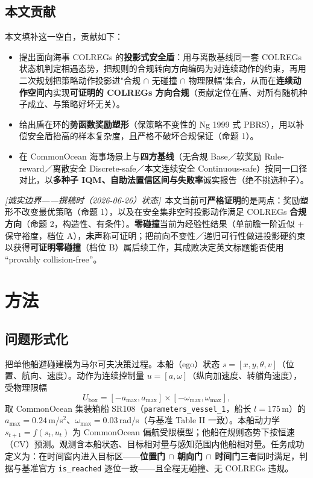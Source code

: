 \documentclass[12pt,letterpaper]{article}
\begin{document}
\subsection{本文贡献}
本文填补这一空白，贡献如下：
\begin{itemize}
  \item 提出面向海事 COLREGs 的\textbf{投影式安全盾}：用与离散基线同一套 COLREGs 状态机判定相遇态势，把规则的合规转向方向编码为对连续动作的约束，再用二次规划把策略动作投影进"合规 $\cap$ 无碰撞 $\cap$ 物理限幅"集合，从而在\textbf{连续动作空间}内实现\textbf{可证明的 COLREGs 方向合规}（贡献定位在盾、对所有随机种子成立、与策略好坏无关）。
  \item 给出盾在环的\textbf{势函数奖励塑形}（保策略不变性的 Ng 1999 式 PBRS），用以补偿安全盾抬高的样本复杂度，且严格不破坏合规保证（命题 1）。
  \item 在 CommonOcean 海事场景上与\textbf{四方基线}（无合规 Base／软奖励 Rule-reward／离散安全 Discrete-safe／本文连续安全 Continuous-safe）按同一口径对比，以\textbf{多种子 IQM、自助法置信区间与失败率}诚实报告（绝不挑选种子）。
\end{itemize}

\textit{[诚实边界——撰稿时（2026-06-26）状态]}\ 本文当前可\textbf{严格证明}的是两点：奖励塑形不改变最优策略（命题 1），以及在安全集非空时投影动作满足 COLREGs \textbf{合规方向}（命题 2，构造性、有条件）。\textbf{零碰撞}当前为经验性结果（单前瞻一阶近似 + 保守裕度，档位 A），\textbf{未}声称可证明；把前向不变性／递归可行性做进投影硬约束以获得\textbf{可证明零碰撞}（档位 B）属后续工作，其成败决定英文标题能否使用 “provably collision-free”。

\section{方法}
\subsection{问题形式化}
把单他船避碰建模为马尔可夫决策过程。本船（ego）状态 $s=[x,y,\theta,v]$（位置、航向、速度）。动作为连续控制量 $u=[a,\omega]$（纵向加速度、转艏角速度），受物理限幅
\begin{equation}
U_{\text{box}}=[-a_{\max},a_{\max}]\times[-\omega_{\max},\omega_{\max}],
\end{equation}
取 CommonOcean 集装箱船 SR108（\texttt{parameters\_vessel\_1}，船长 $l=175$\,m）的 $a_{\max}=0.24$\,m/s$^2$、$\omega_{\max}=0.03$\,rad/s（与基准 Table II 一致）。本船动力学 $s_{t+1}=f(s_t,u_t)$ 为 CommonOcean 偏航受限模型；他船在规则态势下按恒速（CV）预测。观测含本船状态、目标相对量与感知范围内他船相对量。任务成功定义为：在时间窗内进入目标区——\textbf{位置门 $\cap$ 朝向门 $\cap$ 时间门}三者同时满足，判据与基准官方 \texttt{is\_reached} 逐位一致——且全程无碰撞、无 COLREGs 违规。
\end{document}
